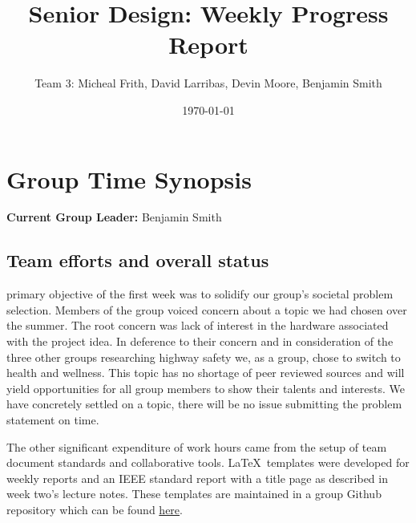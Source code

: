 \documentclass[12pt,article,compsoc]{IEEEtran}
\begin{document}
\title{Senior Design: Weekly Progress Report}
\author{Team 3: Micheal Frith, David Larribas, Devin Moore, Benjamin Smith}
\date{\today}
\maketitle

%
{ }

\section{Group Time Synopsis}
	{\bf Current Group Leader:} Benjamin Smith
	
	\subsection{Team efforts and overall status}
	 primary objective of the first week was to solidify our group’s societal
	problem selection. Members of the group voiced concern about a topic we had chosen over the summer. 
	The root concern was lack of interest in the hardware associated with the project idea. In 
	deference to their concern and in consideration of the three other groups researching highway 
	safety we, as a group, chose to switch to health and wellness. This topic has no shortage of peer
	reviewed sources and will yield opportunities for all group members to show their talents and 
	interests. We have concretely settled on a topic, there will be no issue submitting the problem 
	statement on time. 

	The other significant expenditure of work hours came from the setup of team document standards and 
	collaborative tools. \LaTeX\ templates were developed for weekly reports and an IEEE standard report
	with a title page as described in week two’s lecture notes. These templates are maintained in a 
	group Github repository which can be found \href{http://github.com/2014SeniorProject}{here}.
\end{document}
